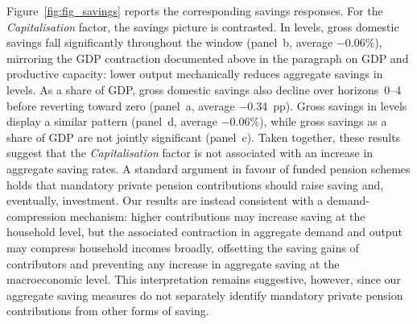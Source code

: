 \documentclass[11pt,english,a4paper, twoside, authoryear]{article}
\begin{document}
Figure~\ref{fig:fig_savings} reports the corresponding savings responses. For the \textit{Capitalisation} factor, the savings picture is contrasted. In levels, gross domestic savings fall significantly throughout the window (panel~b, average $-$0.06\%), mirroring the GDP contraction documented above in the paragraph on GDP and productive capacity: lower output mechanically reduces aggregate savings in levels. As a share of GDP, gross domestic savings also decline over horizons~0--4 before reverting toward zero (panel~a, average $-$0.34~pp). Gross savings in levels display a similar pattern (panel~d, average $-$0.06\%), while gross savings as a share of GDP are not jointly significant (panel~c). Taken together, these results suggest that the \textit{Capitalisation} factor is not associated with an increase in aggregate saving rates. A standard argument in favour of funded pension schemes holds that mandatory private pension contributions should raise saving and, eventually, investment. Our results  are instead consistent with a demand-compression mechanism: higher contributions may increase saving at the household level, but the associated contraction in aggregate demand and output may compress household incomes broadly, offsetting the saving gains of contributors and preventing any increase in aggregate saving at the macroeconomic level. This interpretation remains suggestive, however, since our aggregate saving measures do not separately identify mandatory private pension contributions from other forms of saving.\\
\end{document}
